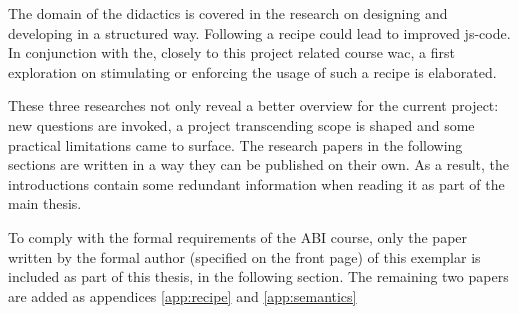 The domain of the didactics is covered in the research on designing and developing
in a structured way. Following a recipe could lead to improved \gls{js-code}. In
conjunction with the, closely to this project related course \gls{wac}, a first
exploration on stimulating or enforcing the usage of such a recipe is elaborated.

These three researches not only reveal a better overview for the current project:
new questions are invoked, a project transcending scope is shaped and some practical
limitations came to surface. The research papers in the following sections are
written in a way they can be published on their own. As a result, the introductions
contain some redundant information when reading it as part of the main thesis.

To comply with the formal requirements of the ABI course, only the paper written
by the formal author (specified on the front page) of this exemplar is included 
as part of this thesis, in the following section. The remaining two papers are 
added as appendices \ref{app:recipe} and \ref{app:semantics}

